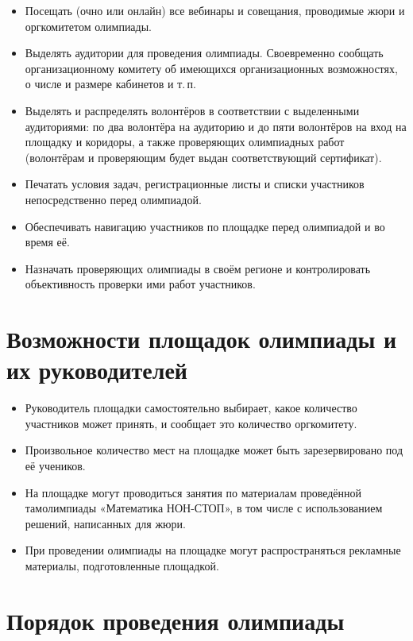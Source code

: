\documentclass[a4paper,12pt]{article}
\newcommand{\mns}{«Математика НОН-СТОП»\xspace}
\begin{document}
\begin{itemize}
	\item Посещать (очно или онлайн) все вебинары и совещания, проводимые жюри и оргкомитетом олимпиады.
	\item Выделять аудитории для проведения олимпиады. Своевременно сообщать организационному комитету об имеющихся организационных возможностях, о числе и размере кабинетов и т.\,п.
	\item Выделять и распределять волонтёров в соответствии с выделенными аудиториями: по два волонтёра на аудиторию и до пяти волонтёров на вход на площадку и коридоры, а также проверяющих олимпиадных работ (волонтёрам и проверяющим будет выдан соответствующий сертификат).
	\item Печатать условия задач, регистрационные листы и списки участников непосредственно перед олимпиадой.
	\item Обеспечивать навигацию участников по площадке перед олимпиадой и во время её.
	\item Назначать проверяющих олимпиады в своём регионе и контролировать объективность проверки ими работ участников.
\end{itemize}

\section{Возможности площадок олимпиады и их руководителей}

\begin{itemize}
	\item Руководитель площадки самостоятельно выбирает, какое количество участников может принять, и сообщает это количество оргкомитету.
	\item Произвольное количество мест на площадке может быть зарезервировано под её учеников.
	\item На площадке могут проводиться занятия по материалам проведённой там\linebreak олимпиады \mns, в том числе с использованием решений, написанных для жюри.
	\item При проведении олимпиады на площадке могут распространяться рекламные материалы, подготовленные площадкой.
\end{itemize}

\section{Порядок проведения олимпиады}
\end{document}
